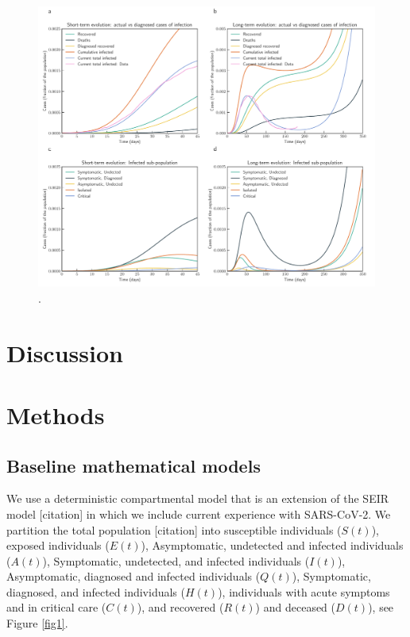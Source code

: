 \documentclass[authoryear,preprint]{elsarticle}
\begin{document}
\begin{figure}
	\centering
	\includegraphics[width=\textwidth]{Italy_evolution.pdf}
	\caption{.} 
	\label{fig2} 
\end{figure}
\section{Discussion}
\label{SEC3}

\section{Methods}
\label{SEC4}
\subsection{Baseline mathematical models}
We use a deterministic compartmental model that is an extension of the SEIR model [citation] in which we include current experience with SARS-CoV-2. We partition the total population [citation] into susceptible individuals ($S(t)$), exposed individuals ($E(t)$), Asymptomatic, undetected and infected individuals ($A(t)$), Symptomatic, undetected, and infected individuals ($I(t)$), Asymptomatic, diagnosed and infected individuals ($Q(t)$), Symptomatic, diagnosed, and infected individuals ($H(t)$), individuals with acute symptoms and in critical care ($C(t)$), and recovered ($R(t)$) and deceased ($D(t)$), see Figure \ref{fig1}.
\end{document}
